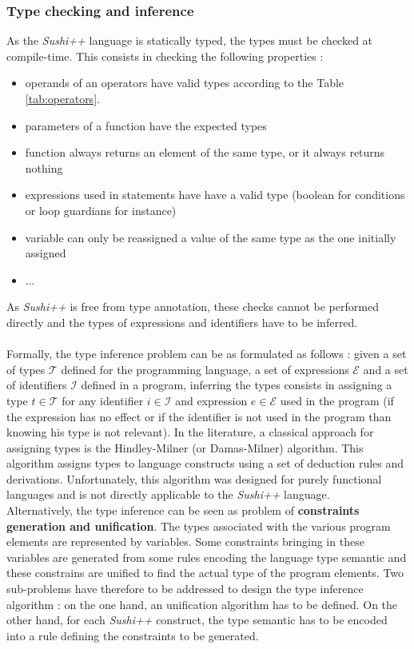\documentclass[a4paper,11pt]{article}
\begin{document}
\subsubsection{Type checking and inference}
As the \textit{Sushi++} language is statically typed, the types must be checked at compile-time. This consists in checking the following properties :
\begin{itemize}
	\item operands of an operators have valid types according to the Table \ref{tab:operators}.
	\item parameters of a function have the expected types
	\item function always returns an element of the same type, or it always returns nothing
	\item expressions used in statements have have a valid type (boolean for conditions or loop guardians for instance)
	\item variable can only be reassigned a value of the same type as the one initially assigned
	\item ...
\end{itemize}
As \textit{Sushi++} is free from type annotation, these checks cannot be performed directly and the types of expressions and identifiers have to be inferred.
\paragraph{}
Formally, the type inference problem can be as formulated as follows : given a set of types $\mathcal{T}$ defined for the programming language, a set of expressions $\mathcal{E}$ and a set of identifiers $\mathcal{I}$ defined in a program, inferring the types consists in assigning a type $t \in \mathcal{T}$ for any identifier $i \in \mathcal{I}$ and expression $e \in \mathcal{E}$ used in the program (if the expression has no effect or if the identifier is not used in the program than knowing his type is not relevant). In the literature, a classical approach for assigning types is the Hindley-Milner (or Damas-Milner) algorithm. This algorithm assigns types to language constructs using a set of deduction rules and derivations. Unfortunately, this algorithm was designed for purely functional languages and is not directly applicable to the \textit{Sushi++} language. \\

Alternatively, the type inference can be seen as problem of \textbf{constraints generation and unification}. The types associated with the various program elements are represented by variables. Some constraints bringing in these variables are generated from some rules encoding the language type semantic and these constrains are unified to find the actual type of the program elements. Two sub-problems have therefore to be addressed to design the type inference algorithm : on the one hand, an unification algorithm has to be defined. On the other hand, for each \textit{Sushi++} construct, the type semantic has to be encoded into a rule defining the constraints to be generated.
\end{document}
